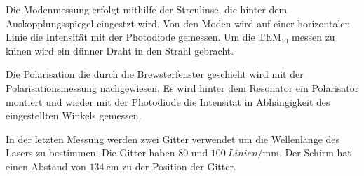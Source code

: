 Die Modenmessung erfolgt mithilfe der Streulinse, die hinter dem Auskopplungsspiegel eingestzt wird.
Von den Moden wird auf einer horizontalen Linie die Intensität mit der Photodiode gemessen.
Um die $\text{TEM}_{10}$ messen zu k\"nnen wird ein dünner Draht in den Strahl gebracht.

Die Polarisation die durch die Brewsterfenster geschieht wird mit der Polarisationsmessung
nachgewiesen. Es wird hinter dem Resonator ein Polarisator montiert und wieder mit der Photodiode
die Intensität in Abhängigkeit des eingestellten Winkels gemessen.

In der letzten Messung werden zwei Gitter verwendet um die Wellenlänge des Lasers zu bestimmen.
Die Gitter haben $\num{80}$ und $\SI{100}{Linien\per\milli\meter}$.
Der Schirm hat einen Abstand von $\SI{134}{\centi\meter}$ zu der Position der Gitter.
